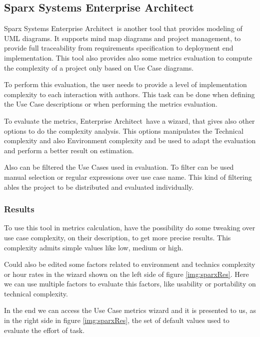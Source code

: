 \subsection{Sparx Systems Enterprise Architect}
\def \entArch {\textsf{Enterprise Architect}}
Sparx Systems \entArch\ is another tool that provides modeling of UML diagrams.
It supports mind map diagrams and project management, to provide full traceability from requirements specification to deployment end implementation.
This tool also provides also some metrics evaluation to compute the complexity of a project only based on Use Case diagrams. 

To perform this evaluation, the user needs to provide a level of implementation complexity to each interaction with authors. 
This task can be done when defining the Use Case descriptions or when performing the metrics evaluation.

To evaluate the metrics, \entArch\ have a wizard, that gives also other options to do the complexity analysis.
This options manipulates the Technical complexity and also Environment complexity and be used to adapt the evaluation and perform a better result on estimation.

Also can be filtered the Use Cases used in evaluation. 
To filter can be used manual selection or regular expressions over use case name.
This kind of filtering ables the project to be distributed and evaluated individually.
\subsubsection{Results}

To use this tool in metrics calculation, have the possibility do some tweaking over use case complexity, on their description, to get more precise results. This complexity admits simple values like low, medium or high.

Could also be edited some factors related to environment and technics complexity or hour rates in the wizard shown on the left side of figure \ref{img:sparxRes}. Here we can use multiple factors to evaluate this factors, like usability or portability on technical complexity.

In the end we can access the Use Case metrics wizard and it is presented to us, as in the right side in figure \ref{img:sparxRes}, the set of default values used to evaluate the effort of task.

